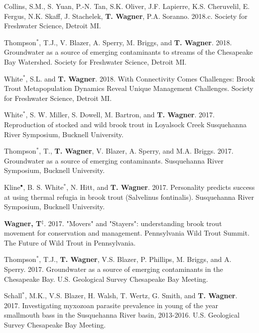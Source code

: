 \documentclass[10pt]{article}
\begin{document}
\begin{flushleft}
\begin{etaremune}
\item Collins, S.M., S. Yuan, P.-N. Tan, S.K. Oliver, J.F. Lapierre, K.S. Cheruvelil, E. Fergus, N.K. Skaff, J. Stachelek, {\bf T. Wagner}, P.A. Soranno. 2018.c. Society for Freshwater Science, Detroit MI.

\item Thompson$^*$, T.J., V. Blazer, A. Sperry, M. Briggs, and {\bf T. Wagner}. 2018. Groundwater as a source of emerging contaminants to streams of the Chesapeake Bay Watershed. Society for Freshwater Science, Detroit MI.

\item White$^*$, S.L. and {\bf T. Wagner}. 2018. With Connectivity Comes Challenges: Brook Trout Metapopulation Dynamics Reveal Unique Management Challenges. Society for Freshwater Science, Detroit MI.

\item White$^*$, S. W. Miller, S. Dowell, M. Bartron, and {\bf T. Wagner}. 2017. Reproduction of stocked and wild brook trout in Loyalsock Creek  Susquehanna River Symposium, Bucknell University.

\item Thompson$^*$, T., {\bf T. Wagner}, V. Blazer, A. Sperry, and M.A. Briggs. 2017. Groundwater as a source of emerging contaminants. Susquehanna River Symposium, Bucknell University.

\item Kline$^\bullet$, B. S. White$^*$, N. Hitt, and {\bf T. Wagner}. 2017. Personality predicts success at using thermal refugia in brook trout (Salvelinus fontinalis). Susquehanna River Symposium, Bucknell University.

\item {\bf Wagner, T}$^\ddagger$. 2017. "Movers" and "Stayers": understanding brook trout movement for conservation and management. Pennsylvania Wild Trout Summit. The Future of Wild Trout in Pennsylvania.

\item Thompson$^*$, T.J., {\bf T. Wagner}, V.S. Blazer, P. Phillips, M. Briggs, and A. Sperry. 2017. Groundwater as a source of emerging contaminants in the Chesapeake Bay. U.S. Geological Survey Chesapeake Bay Meeting.

\item Schall$^*$, M.K., V.S. Blazer, H. Walsh, T. Wertz, G. Smith, and {\bf T. Wagner}. 2017. Investigating myxozoan parasite prevalence in young of the year smallmouth bass in the Susquehanna River basin, 2013-2016. U.S. Geological Survey Chesapeake Bay Meeting.


\end{etaremune}
\end{flushleft}
\end{document}

